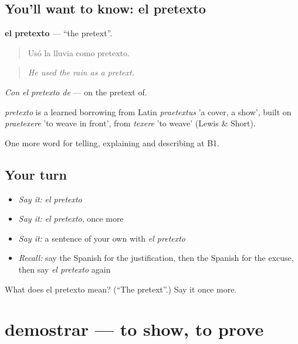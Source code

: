 \subsection*{You'll want to know: el pretexto}
\textbf{el pretexto} — \textquotedblleft{}the pretext\textquotedblright{}.

\begin{quote}
Usó la lluvia como pretexto.
\end{quote}

\begin{quote}
\emph{He used the rain as a pretext.}
\end{quote}

\emph{Con el pretexto de} — on the pretext of.

\begin{cousinweb}
\emph{pretexto} is a learned borrowing from Latin \emph{praetextus} 'a cover, a show', built on \emph{praetexere} 'to weave in front', from \emph{texere} 'to weave' (Lewis \& Short).
\end{cousinweb}

\begin{grammarlens}[title={What you've built}]
One more word for telling, explaining and describing at B1.
\end{grammarlens}

\subsection*{Your turn}
\begin{itemize}
\raggedright
  \item \emph{Say it:} \emph{el pretexto}
  \item \emph{Say it:} \emph{el pretexto}, once more
  \item \emph{Say it:} a sentence of your own with \emph{el pretexto}
  \item \emph{Recall:} say the Spanish for the justification, then the Spanish for the excuse, then say \emph{el pretexto} again
\end{itemize}

\begin{tcolorbox}[breakable,colback=teal!4,colframe=teal!35!black,title={Before you move on}]
What does el pretexto mean? (\textquotedblleft{}The pretext\textquotedblright{}.) Say it once more.
\end{tcolorbox}
\section[demostrar]{demostrar — to show, to prove}

